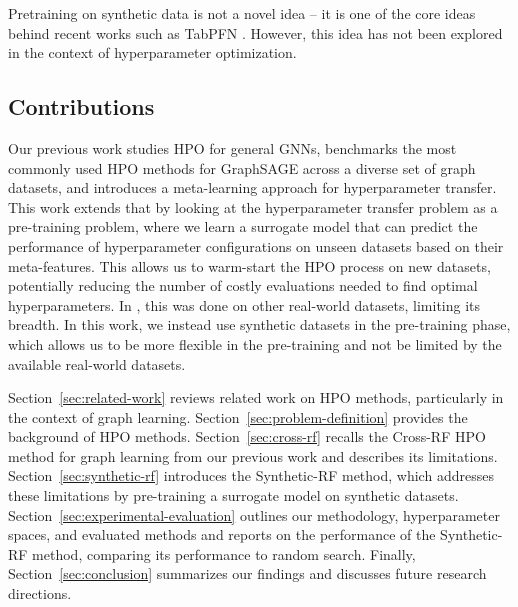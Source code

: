 Pretraining on synthetic data is not a novel idea -- it is one of the core ideas behind recent works such as TabPFN \cite{hollmann_accurate_2025}. However, this idea has not been explored in the context of hyperparameter optimization.

\subsection{Contributions}

Our previous work \cite{dedic_benchmarking_2026} studies HPO for general GNNs, benchmarks the most commonly used HPO methods for GraphSAGE \cite{hamilton_inductive_2017} across a diverse set of graph datasets, and introduces a meta-learning approach for hyperparameter transfer. This work extends that by looking at the hyperparameter transfer problem as a pre-training problem, where we learn a surrogate model that can predict the performance of hyperparameter configurations on unseen datasets based on their meta-features. This allows us to warm-start the HPO process on new datasets, potentially reducing the number of costly evaluations needed to find optimal hyperparameters. In \cite{dedic_benchmarking_2026}, this was done on other real-world datasets, limiting its breadth. In this work, we instead use synthetic datasets in the pre-training phase, which allows us to be more flexible in the pre-training and not be limited by the available real-world datasets.

Section~\ref{sec:related-work} reviews related work on HPO methods, particularly in the context of graph learning. Section~\ref{sec:problem-definition} provides the background of HPO methods. Section~\ref{sec:cross-rf} recalls the Cross-RF HPO method for graph learning from our previous work and describes its limitations. Section~\ref{sec:synthetic-rf} introduces the Synthetic-RF method, which addresses these limitations by pre-training a surrogate model on synthetic datasets. Section~\ref{sec:experimental-evaluation} outlines our methodology, hyperparameter spaces, and evaluated methods and reports on the performance of the Synthetic-RF method, comparing its performance to random search. Finally, Section~\ref{sec:conclusion} summarizes our findings and discusses future research directions.
